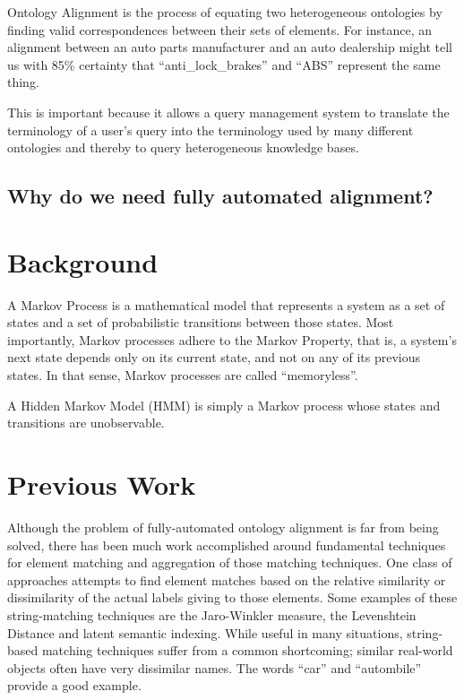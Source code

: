 \documentclass[letterpaper,twocolumn,10pt]{article}
\begin{document}
Ontology Alignment is the process of equating two heterogeneous ontologies by
finding valid correspondences between their sets of elements. 
%
For instance, an alignment between an auto parts manufacturer and an auto dealership
might tell us with 85\% certainty that ``anti\_lock\_brakes'' and ``ABS'' represent
the same thing.

This is important because it allows a query management system to translate the terminology
of a user's query into the terminology used by many different ontologies and thereby
to query heterogeneous knowledge bases.
\subsection{Why do we need fully automated alignment?}

\section{Background}

A Markov Process is a mathematical model that represents a system as a set of states
and a set of probabilistic transitions between those states. Most importantly, Markov 
processes adhere to the Markov Property, that is, a system's next state depends only
on its current state, and not on any of its previous states. In that sense, Markov
processes are called ``memoryless''.

A Hidden Markov Model (HMM) is simply a Markov process whose states and transitions
are unobservable.
\newline

\section{Previous Work}

Although the problem of fully-automated ontology alignment is far from being solved,
there has been much work accomplished around fundamental techniques for element
matching and aggregation of those matching techniques. One class of approaches
attempts to find element matches based on the relative similarity or dissimilarity
of the actual labels giving to those elements. Some examples of these string-matching 
techniques are the Jaro-Winkler measure, the Levenshtein Distance and latent semantic 
indexing.
%
While useful in many situations, string-based matching techniques suffer from a common 
shortcoming; similar real-world objects often have very dissimilar names. The words
``car'' and ``autombile'' provide a good example.
\end{document}
